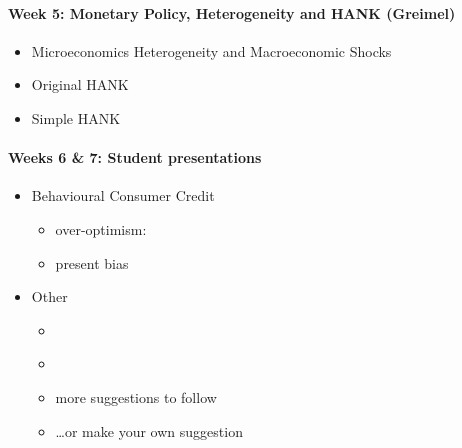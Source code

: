 \documentclass[a4paper,12pt]{article}
\begin{document}
\paragraph{Week 5: Monetary Policy, Heterogeneity and HANK (Greimel)}
\begin{itemize}
\item Microeconomics Heterogeneity and Macroeconomic Shocks \citep{kaplan2018microeconomic}
\item Original HANK \citep{kaplan2018monetary}
\item Simple HANK \citep{bilbiie2018analytical}
\end{itemize}

\paragraph{Weeks 6 \& 7: Student presentations}

\begin{itemize}
\item Behavioural Consumer Credit
  \begin{itemize}
  \item over-optimism: \citep{exler2020over-optimistic}
  \item present bias \citep{laibson2021present}
  \end{itemize}
\item Other
  \begin{itemize}
  \item \citet{bailey2019beliefs-leverage}
  \item \citet{laibson2022mpc-to-mpx}
  \item more suggestions to follow
  \item \dots or make your own suggestion
  \end{itemize}
\end{itemize}





\end{document}
